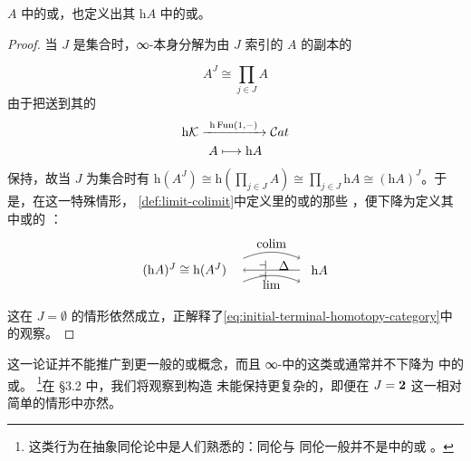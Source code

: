 \begin{lemma}\label{lem:products-homotopy-category}
\trInfinityCategory{} $A$ 中的\trProduct{}或\trCoproduct{}，也定义出其\trHomotopyCategory{}
$\mathrm{h}A$ 中的\trProduct{}或\trCoproduct{}。
\end{lemma}
\begin{proof}
当 $J$ 是集合时，\trDiagram{}∞-\trCategory{}本身分解为由 $J$ 索引的
$A$ 的副本的\trProduct

\begin{equation*}
A^J\cong\prod_{j\in J}A
\end{equation*}
由于把\trInfinityCategory{}送到其\trHomotopyCategory{}的%
\trTwoFunctor{}
\begin{equation*}
\begin{gathered}
\mathrm{h}\mathcal{K}
\xrightarrow{\ \mathrm{h}\operatorname{Fun}(1,-)\ }\mathcal{C}at\\
A\longmapsto\mathrm{h}A
\end{gathered}
\end{equation*}
保持\trProduct{}，故当 $J$ 为集合时有 $\mathrm{h}(A^J)\cong\mathrm{h}(\prod_{j\in J}A)\cong\prod_{j\in J}\mathrm{h}A\cong(\mathrm{h}A)^J$。于是，在这一特殊情形，
\cref{def:limit-colimit}中定义\trInfinityCategory{}里的\trProduct{}或\trCoproduct{}的那些%
\trAdjunction{}，便下降为定义其\trHomotopyCategory{}中\trProduct{}或\trCoproduct{}的%
\trAdjunction{}：
\begin{equation*}
\mbox{\begin{tikzpicture}[x=1.4em,y=1.4em]
  \node (hAJ) at (0,0) {$(\mathrm{h}A)^J\cong\mathrm{h}(A^J)$};
  \node (hA) at (7.6,0) {$\mathrm{h}A$};
  \draw[->] (3.3,0.66) to[bend left=22] node[above]{$\colim$} (6.5,0.66);
  \node at (4.4,0.30) {$\dashv$};
  \draw[->] (6.5,0) -- (3.3,0);
  \node at (5.6,0.26) {$\Delta$};
  \node at (4.4,-0.30) {$\dashv$};
  \draw[->] (3.3,-0.66) to[bend left=22] node[below]{$\lim$} (6.5,-0.66);
\end{tikzpicture}}
\end{equation*}
这在 $J=\emptyset$ 的情形依然成立，正解释了\cref{eq:initial-terminal-homotopy-category}中
的观察。
\end{proof}

\begin{warning}\label{war:converse-false}
这一论证并不能推广到更一般的\trLimit{}或\trColimit{}概念，而且%
∞-\trCategory{}中的这类\trLimit{}或\trColimit{}通常并不下降为%
\trHomotopyCategory{}中的\trLimit{}或\trColimit{}。%
\footnote{这类行为在抽象同伦论中是人们熟悉的：同伦\trLimit{}与%
同伦\trColimit{}一般并不是\trHomotopyCategory{}中的\trLimit{}或%
\trColimit{}。}在 §3.2 中，我们将观察到\trHomotopyCategory{}构造%
未能保持更复杂的\trCotensor{}，即便在 $J=\mathbf{2}$ 这一相对简单的情形中亦然。
\end{warning}

